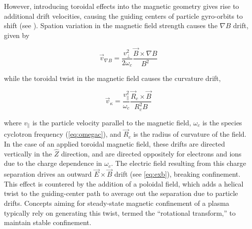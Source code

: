 However, introducing toroidal effects into the magnetic geometry gives rise to additional drift velocities, causing the guiding centers of particle gyro-orbits to shift (see \cite[\S 8.5-7]{Freidberg2007}).  Spation variation in the magnetic field strength causes the $\nabla B$ drift, given by

\begin{equation}\label{eq:gradbdrift}
 \vec{v}_{\nabla B} = \frac{v_\perp^2}{2\omega_c} \frac{\vec{B} \times \nabla B}{B^2}
\end{equation}

\noindent while the toroidal twist in the magnetic field causes the curvature drift,

\begin{equation}\label{eq:curvaturedrift}
 \vec{v}_\kappa = \frac{v_\parallel^2}{\omega_c} \frac{\vec{R}_c \times \vec{B}}{R_c^2 B}
\end{equation}

\noindent where $v_\parallel$ is the particle velocity parallel to the magnetic field, $\omega_c$ is the species cyclotron frequency (\cref{eq:omegac}), and $\vec{R}_c$ is the radius of curvature of the field.  In the case of an applied toroidal magnetic field, these drifts are directed vertically in the $\hat{Z}$ direction, and are directed oppositely for electrons and ions due to the charge dependence in $\omega_c$.  The electric field resulting from this charge separation drives an outward $\vec{E} \times \vec{B}$ drift (see \cref{eq:exb}), breaking confinement.  This effect is countered by the addition of a poloidal field, which adds a helical twist to the guiding-center path to average out the separation due to particle drifts.  Concepts aiming for steady-state magnetic confinement of a plasma typically rely on generating this twist, termed the ``rotational transform,'' to maintain stable confinement.


